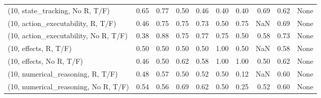 \begin{table*}[h!]
\begin{adjustbox}{width=2\columnwidth,center}
\begin{tabular}{lrrr|rrr|rrr}
(10, state\_tracking, No R, T/F)       &                      0.65 &                  0.77 &                      0.50 &                          0.46 &                      0.40 &                          0.40 &                                   0.69 &                               0.62 &                                  None \\
(10, action\_executability, R, T/F)    &                      0.46 &                  0.75 &                      0.75 &                          0.73 &                      0.50 &                          0.75 &                                    NaN &                               0.69 &                                  None \\
(10, action\_executability, No R, T/F) &                      0.38 &                  0.88 &                      0.75 &                          0.77 &                      0.75 &                          0.50 &                                   0.58 &                               0.73 &                                  None \\
(10, effects, R, T/F)                 &                      0.50 &                  0.50 &                      0.50 &                          0.50 &                      1.00 &                          0.50 &                                    NaN &                               0.58 &                                  None \\
(10, effects, No R, T/F)              &                      0.46 &                  0.50 &                      0.62 &                          0.58 &                      1.00 &                          1.00 &                                   0.50 &                               0.62 &                                  None \\
(10, numerical\_reasoning, R, T/F)     &                      0.48 &                  0.57 &                      0.50 &                          0.52 &                      0.50 &                          0.12 &                                    NaN &                               0.60 &                                  None \\
(10, numerical\_reasoning, No R, T/F)  &                      0.54 &                  0.56 &                      0.69 &                          0.62 &                      0.50 &                          0.25 &                                   0.52 &                               0.60 &                                  None \\

\end{tabular}
\end{adjustbox}
\end{table*}

